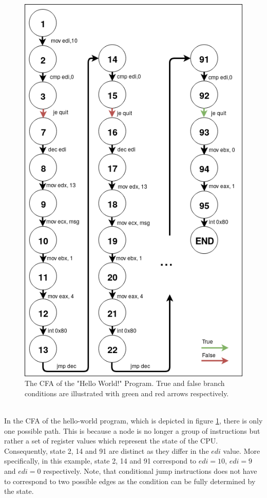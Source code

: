 \documentclass{kththesis}
\begin{document}
\begin{figure}[th]
    \centering
    \includegraphics[scale=0.4]{Images/CFA.png}
    \caption{The CFA of the "Hello World!" Program. True and false branch conditions are illustrated with green and red arrows respectively.}
    \label{fig:HelloCFA}
\end{figure}
\noindent
\\
In the CFA of the hello-world program, which is depicted in figure \ref{fig:HelloCFA}, there is only one possible path. This is because a node is no longer a group of instructions but rather a set of register values which represent the state of the CPU. Consequently, state 2, 14 and 91 are distinct as they differ in the $edi$ value. More specifically, in this example, state 2, 14 and 91 correspond to $edi=10$, $edi=9$ and $edi=0$ respectively. Note, that conditional jump instructions does not have to correspond to two possible edges as the condition can be fully determined by the state. 
\end{document}
